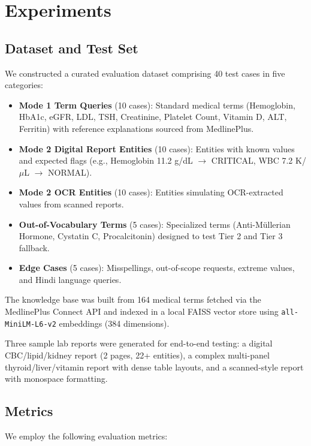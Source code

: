 \documentclass[conference]{IEEEtran}
\begin{document}
\section{Experiments}

\subsection{Dataset and Test Set}

We constructed a curated evaluation dataset comprising 40 test cases in five categories:

\begin{itemize}
    \item \textbf{Mode 1 Term Queries} (10 cases): Standard medical terms (Hemoglobin, HbA1c, eGFR, LDL, TSH, Creatinine, Platelet Count, Vitamin D, ALT, Ferritin) with reference explanations sourced from MedlinePlus.
    \item \textbf{Mode 2 Digital Report Entities} (10 cases): Entities with known values and expected flags (e.g., Hemoglobin 11.2 g/dL $\rightarrow$ CRITICAL, WBC 7.2 K/$\mu$L $\rightarrow$ NORMAL).
    \item \textbf{Mode 2 OCR Entities} (10 cases): Entities simulating OCR-extracted values from scanned reports.
    \item \textbf{Out-of-Vocabulary Terms} (5 cases): Specialized terms (Anti-M\"ullerian Hormone, Cystatin C, Procalcitonin) designed to test Tier 2 and Tier 3 fallback.
    \item \textbf{Edge Cases} (5 cases): Misspellings, out-of-scope requests, extreme values, and Hindi language queries.
\end{itemize}

The knowledge base was built from 164 medical terms fetched via the MedlinePlus Connect API and indexed in a local FAISS vector store using \texttt{all-MiniLM-L6-v2} embeddings (384 dimensions).

Three sample lab reports were generated for end-to-end testing: a digital CBC/lipid/kidney report (2 pages, 22+ entities), a complex multi-panel thyroid/liver/vitamin report with dense table layouts, and a scanned-style report with monospace formatting.

\subsection{Metrics}

We employ the following evaluation metrics:
\end{document}
